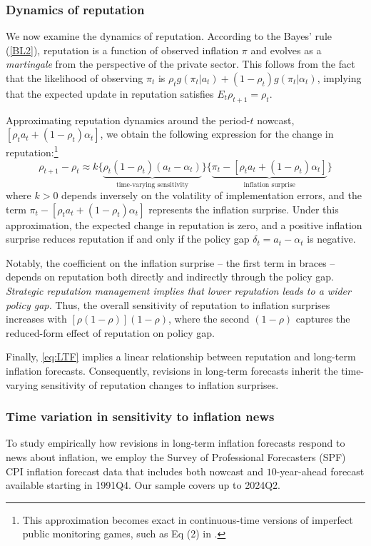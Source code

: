 \documentclass[12pt,letter,leqno]{article}
\theoremstyle{asn}
\theoremstyle{lem}
\theoremstyle{slem}
\theoremstyle{prop}
\theoremstyle{appprop}
\theoremstyle{rem}
\theoremstyle{defn}
\begin{document}
\subsubsection{Dynamics of reputation}
We now examine the dynamics of reputation. According to the Bayes' rule (\ref{BL2}), reputation is a function of observed inflation $\pi$ and evolves as a \textit{martingale} from the perspective of the private sector. This follows from the fact that the likelihood of observing $\pi_t$ is $\rho_t g(\pi_t | a_t) + (1 - \rho_t) g(\pi_t | \alpha_t)$, implying that the expected update in reputation satisfies $E_t \rho_{t+1} = \rho_t$.

Approximating reputation dynamics around the period-$t$ nowcast, $[\rho_t a_t + (1 - \rho_t) \alpha_t]$, we obtain the following expression for the change in reputation:\footnote{This approximation becomes exact in continuous-time versions of imperfect public monitoring games, such as Eq (2) in \cite{faingold_reputation_2011}.}
\begin{equation}\label{eq:rhoapprox}
\rho_{t+1} - \rho_t \approx k \{\underbrace{\rho_t(1 - \rho_t)(a_t - \alpha_t)}_{\text{time-varying sensitivity}}  \}
\{\underbrace{\pi_t - [\rho_t a_t + (1 - \rho_t) \alpha_t]}_{\text{inflation surprise}} \}
\end{equation}
where $k > 0$ depends inversely on the volatility of implementation errors, and the term $\pi_t - [\rho_t a_t + (1 - \rho_t) \alpha_t]$ represents the inflation surprise. Under this approximation, the expected change in reputation is zero, and a positive inflation surprise reduces reputation if and only if the policy gap $\delta_t = a_t - \alpha_t$ is negative.

Notably, the coefficient on the inflation surprise -- the first term in braces -- depends on reputation both directly and indirectly through the policy gap. \textit{Strategic reputation management implies that lower reputation leads to a wider policy gap.} Thus, the overall sensitivity of reputation to inflation surprises increases with $[\rho(1 - \rho)](1 - \rho)$, where the second $(1 - \rho)$ captures the reduced-form effect of reputation on policy gap.

Finally, \eqref{eq:LTF} implies a linear relationship between reputation and long-term inflation forecasts. Consequently, revisions in long-term forecasts inherit the time-varying sensitivity of reputation changes to inflation surprises.



\subsubsection{Time variation in sensitivity to inflation news}
To study empirically how revisions in long-term inflation forecasts respond to news about inflation, we employ the Survey of Professional Forecasters (SPF) CPI inflation forecast data that includes both nowcast and $10$-year-ahead forecast available starting in 1991Q4. Our sample covers up to 2024Q2.
\end{document}
